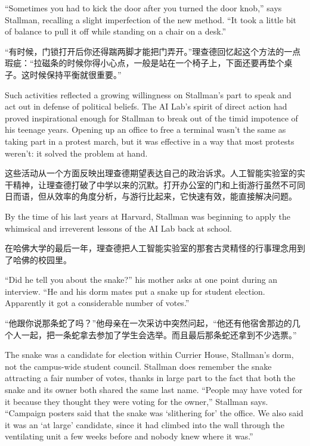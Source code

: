 \ifdefined\eng
``Sometimes you had to kick the door after you turned the door knob,'' says Stallman, recalling a slight imperfection of the new method. ``It took a little bit of balance to pull it off while standing on a chair on a desk.''
\fi

\ifdefined\chs
``有时候，门锁打开后你还得踹两脚才能把门弄开。''理查德回忆起这个方法的一点瑕疵：``拉磁条的时候你得小心点，一般是站在一个椅子上，下面还要再垫个桌子。这时候保持平衡就很重要。''
\fi

\ifdefined\eng
Such activities reflected a growing willingness on Stallman's part to speak and act out in defense of political beliefs. The AI Lab's spirit of direct action had proved inspirational enough for Stallman to break out of the timid impotence of his teenage years. Opening up an office to free a terminal wasn't the same as taking part in a protest march, but it was effective in a way that most protests weren't: it solved the problem at hand.
\fi

\ifdefined\chs
这些活动从一个方面反映出理查德期望表达自己的政治诉求。人工智能实验室的实干精神，让理查德打破了中学以来的沉默。打开办公室的门和上街游行虽然不可同日而语，但从效率的角度分析，与游行比起来，它快速有效，能直接解决问题。
\fi

\ifdefined\eng
By the time of his last years at Harvard, Stallman was beginning to apply the whimsical and irreverent lessons of the AI Lab back at school.
\fi

\ifdefined\chs
在哈佛大学的最后一年，理查德把人工智能实验室的那套古灵精怪的行事理念用到了哈佛的校园里。
\fi

\ifdefined\eng
``Did he tell you about the snake?'' his mother asks at one point during an interview. ``He and his dorm mates put a snake up for student election. Apparently it got a considerable number of votes.''
\fi

\ifdefined\chs
``他跟你说那条蛇了吗？''他母亲在一次采访中突然问起，``他还有他宿舍那边的几个人一起，把一条蛇拿去参加了学生会选举。而且最后那条蛇还拿到不少选票。''
\fi

\ifdefined\eng
The snake was a candidate for election within Currier House, Stallman's dorm, not the campus-wide student council. Stallman does remember the snake attracting a fair number of votes, thanks in large part to the fact that both the snake and its owner both shared the same last name. ``People may have voted for it because they thought they were voting for the owner,'' Stallman says. ``Campaign posters said that the snake was `slithering for' the office. We also said it was an `at large' candidate, since it had climbed into the wall through the ventilating unit a few weeks before and nobody knew where it was.''
\fi

